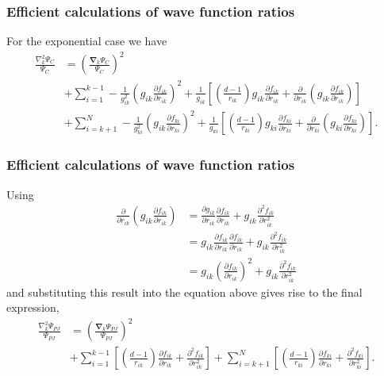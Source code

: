 \documentclass[compress]{beamer}
\newcommand{\bfv}[1]{\boldsymbol{#1}}                     %
\begin{document}
 {
   \frametitle{Efficient calculations of wave function ratios}
 \begin{small}
 {\scriptsize

For the exponential case we have
\begin{align*}
 \frac{\nabla_{k}^2 \Psi_{C}}{\Psi_{C}} & =  \left(\frac{\bfv{\nabla}_k \Psi_{C}}{\Psi_{C}}\right)^2 \nonumber\\
 & + \sum_{i=1}^{k-1} -\frac{1}{g_{ik}^2}\left(g_{ik}\frac{\partial f_{ik}}{\partial r_{ik}}\right)^2 + \frac{1}{g_{ik}}\left[\left(\frac{d-1}{r_{ik}}\right)g_{ik}\frac{\partial f_{ik}}{\partial r_{ik}} + \frac{\partial }{\partial r_{ik}}\left(g_{ik}\frac{\partial f_{ik}}{\partial r_{ik}}\right) \right]\nonumber\\
 & + \sum_{i=k+1}^{N} -\frac{1}{g_{ki}^2}\left(g_{ik}\frac{\partial f_{ki}}{\partial r_{ki}}\right)^2 + \frac{1}{g_{ki}}\left[\left(\frac{d-1}{r_{ki}}\right)g_{ki}\frac{\partial f_{ki}}{\partial r_{ki}} + \frac{\partial }{\partial r_{ki}}\left(g_{ki}\frac{\partial f_{ki}}{\partial r_{ki}}\right) \right].
 \end{align*}
 }
 \end{small}
 }\frame
 {
   \frametitle{Efficient calculations of wave function ratios}
 \begin{small}
 {\scriptsize

Using
\begin{align*}
 \frac{\partial }{\partial r_{ik}}\left(g_{ik}\frac{\partial f_{ik}}{\partial r_{ik}}\right) & = \frac{\partial g_{ik}}{\partial r_{ik}}\frac{\partial f_{ik}}{\partial r_{ik}} + g_{ik}\frac{\partial^2 f_{ik}}{\partial r_{ik}^2}\\
 & = g_{ik}\frac{\partial f_{ik}}{\partial r_{ik}}\frac{\partial f_{ik}}{\partial r_{ik}} + g_{ik}\frac{\partial^2 f_{ik}}{\partial r_{ik}^2}\\
 & = g_{ik}\left(\frac{\partial f_{ik}}{\partial r_{ik}}\right)^2 + g_{ik}\frac{\partial^2 f_{ik}}{\partial r_{ik}^2}
\end{align*}
and substituting this result into the equation above gives rise to the final expression,
\begin{align}\label{lapJasRatio}
\frac{\nabla_{k}^2 \Psi_{PJ}}{\Psi_{PJ}}  &=  \left(\frac{\bfv{\nabla}_k \Psi_{PJ}}{\Psi_{PJ}}\right)^2\nonumber\\
  &+ \sum_{i=1}^{k-1} \left[\left(\frac{d-1}{r_{ik}}\right)\frac{\partial f_{ik}}{\partial r_{ik}} + \frac{\partial^2  f_{ik}}{\partial r_{ik}^2} \right]
  + \sum_{i=k+1}^{N} \left[\left(\frac{d-1}{r_{ki}}\right)\frac{\partial f_{ki}}{\partial r_{ki}} + \frac{\partial^2 f_{ki}}{\partial r_{ki}^2} \right].
 \end{align}
 }
 \end{small}
 }
\end{document}

